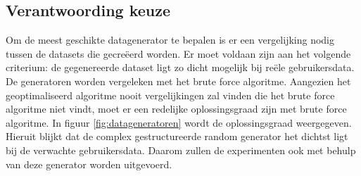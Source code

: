 \documentclass[Main.tex]{subfiles}
\begin{document}
\subsection{Verantwoording keuze}
Om de meest geschikte datagenerator te bepalen is er een vergelijking nodig tussen de datasets die gecre\"eerd worden. Er moet voldaan zijn aan het volgende criterium: de gegenereerde dataset ligt zo dicht mogelijk bij re\"ele gebruikersdata. De generatoren worden vergeleken met het brute force algoritme. Aangezien het geoptimaliseerd algoritme nooit vergelijkingen zal vinden die het brute force algoritme niet vindt, moet er een redelijke oplossingsgraad zijn met brute force algoritme. In figuur \ref{fig:datageneratoren} wordt de oplossingsgraad weergegeven. Hieruit blijkt dat de complex gestructureerde random generator het dichtst ligt bij de verwachte gebruikersdata. Daarom zullen de experimenten ook met behulp van deze generator worden uitgevoerd.
\end{document}
